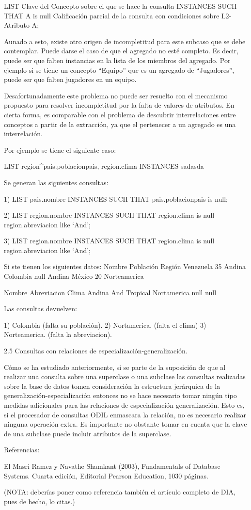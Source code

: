 LIST Clave del Concepto sobre el que se hace la consulta INSTANCES
SUCH THAT A is null  Calificación parcial de la consulta con condiciones sobre L2-{Atributo A};

	Aunado a esto, existe otro origen de incompletitud para este subcaso que se debe contemplar. Puede darse el caso de que el agregado no esté completo. Es decir, puede ser que falten instancias en la lista de los miembros del agregado. Por ejemplo si se tiene un concepto “Equipo” que es un agregado de “Jugadores”, puede ser que falten jugadores en un equipo.

	Desafortunadamente este problema no puede ser resuelto con el mecanismo propuesto para resolver incompletitud por la falta de valores de atributos. En cierta forma, es comparable con el problema de descubrir interrelaciones entre conceptos a partir de la extracción, ya que el pertenecer a un agregado es una interrelación.

	Por ejemplo se tiene el siguiente caso:

LIST region^pais.poblacionpais, region.clima INSTANCES
sadasda

Se generan las siguientes consultas:

1) LIST pais.nombre INSTANCES
SUCH THAT pais.poblacionpais is null;

2) LIST region.nombre INSTANCES
SUCH THAT region.clima is null  region.abreviacion like ‘And’;

3) LIST region.nombre INSTANCES
SUCH THAT region.clima is null  region.abreviacion like ‘And’;

	Si ste tienen los siguientes datos:
Nombre
Población
Región
Venezuela
35
Andina
Colombia
null
Andina
México
20
Norteamerica


Nombre
Abreviacion
Clima
Andina
And
Tropical
Nortamerica
null
null



Las consultas devuelven:

1) Colombia (falta su población).
2) Nortamerica. (falta el clima)
3) Norteamerica. (falta la abreviacion).

2.5 Consultas con relaciones de especialización-generalización.

	Cómo se ha estudiado anteriormente, si se parte de la suposición de que al realizar una consulta sobre una superclase o una subclase las consultas realizadas sobre la base de datos tomen consideración la estructura jerárquica de la generalización-especialización entonces no se hace necesario tomar ningún tipo medidas adicionales para las relaciones de especialización-generalización. Esto es, si el procesador de consultas ODIL enmascara la relación, no es necesario realizar ninguna operación extra. Es importante no obstante tomar en cuenta que la clave de una subclase puede incluir atributos de la superclase.

Referencias:

El Masri Ramez  y Navathe Shamkant (2003), Fundamentals of Database Systems. Cuarta edición, Editorial Pearson Education, 1030 páginas.

(NOTA: deberías poner como referencia también el artículo completo de DIA, pues de hecho, lo citas.)